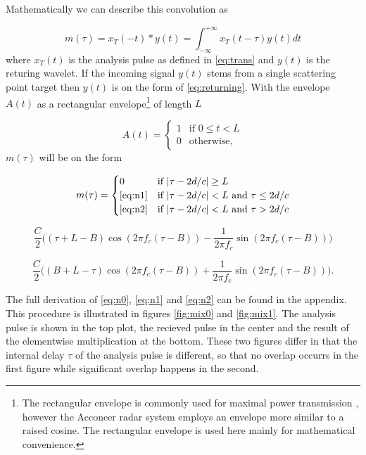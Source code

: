 Mathematically we can describe this convolution as

\begin{equation}
	m(\tau) 
	= x_T(-t) * y(t)
	= \int_{-\infty}^{+\infty} x_T(t - \tau)y(t) dt
\end{equation}
where $x_T(t)$ is the analysis pulse as defined in \eqref{eq:trans} and $y(t)$ is the returing wavelet. If the incoming signal $y(t)$ stems from a single scattering point target then $y(t)$ is on the form of \eqref{eq:returning}. With the envelope $A(t)$ as a rectangular envelope\footnote{The rectangular envelope is commonly used for maximal power transmission \citep{richards_2014}, however the Acconeer radar system employs an envelope more similar to a raised cosine. The rectangular envelope is used here mainly for mathematical convenience.} of length $L$

\begin{equation}
	A(t) = \begin{cases}
		1 & \text{if $0\leq t < L$} \\
		0 & \text{otherwise},
	\end{cases}
\end{equation}
$m(\tau)$ will be on the form 

\begin{equation}\label{eq:n0}
	m(\tau) = 
	\begin{cases}
		0 & \text{if $|\tau-2d/c|\geq L$} \\
		\text{\eqref{eq:n1}} & \text{if $|\tau-2d/c|<L$ and $\tau \leq 2d/c$} \\
		\text{\eqref{eq:n2}} & \text{if $|\tau-2d/c|<L$ and $\tau > 2d/c$}
	\end{cases}
\end{equation}

\begin{equation}\label{eq:n1}
	\frac{C}{2}\Big((\tau + L - B)\cos(2\pi f_c(\tau - B)) 
	- \frac{1}{2\pi f_c}\sin(2\pi f_c(\tau - B))\Big)
\end{equation}

\begin{equation}\label{eq:n2}
	\frac{C}{2}\Big((B + L - \tau)\cos(2\pi f_c(\tau - B)) 
	+ \frac{1}{2\pi f_c}\sin(2\pi f_c(\tau - B))\Big).
\end{equation}

The full derivation of \eqref{eq:n0}, \eqref{eq:n1} and \eqref{eq:n2} can be found in the appendix. This procedure is illustrated in figures \ref{fig:mix0} and \ref{fig:mix1}. The analysis pulse is shown in the top plot, the recieved pulse in the center and the result of the elementwise multiplication at the bottom. These two figures differ in that the internal delay $\tau$ of the analysis pulse is different, so that no overlap occurrs in the first figure while significant overlap happens in the second.

